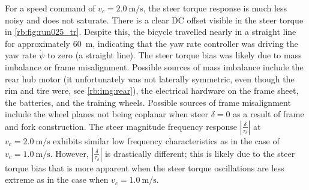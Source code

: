 For a speed command of $v_c=\SI{2.0}{\m\per\s}$, the steer torque response is
much less noisy and does not saturate. There is a clear DC offset visible in
the steer torque in \autoref{rb:fig:run025_tr}. Despite this, the bicycle
travelled nearly in a straight line for approximately \SI{60}{\m}, indicating
that the yaw rate controller was driving the yaw rate $\dot{\psi}$ to zero (a
straight line). The steer torque bias was likely due to mass imbalance or frame
misalignment.  Possible sources of mass imbalance include the rear hub motor
(it unfortunately was not laterally symmetric, even though the rim and tire
were, see \autoref{rb:img:rear}), the electrical hardware on the frame sheet,
the batteries, and the training wheels. Possible sources of frame misalignment
include the wheel planes not being coplanar when steer $\delta=0$ as a result
of frame and fork construction. The steer magnitude frequency response
$|\frac{\delta}{\tau_\delta}|$ at $v_c=\SI{2.0}{\m\per\s}$ exhibits similar low
frequency characteristics as in the case of $v_c=\SI{1.0}{\m\per\s}$.  However,
$|\frac{\delta}{\tau_\delta}|$ is drastically different; this is likely due to
the steer torque bias that is more apparent when the steer torque oscillations
are less extreme as in the case when $v_c=\SI{1.0}{\m\per\s}$.


